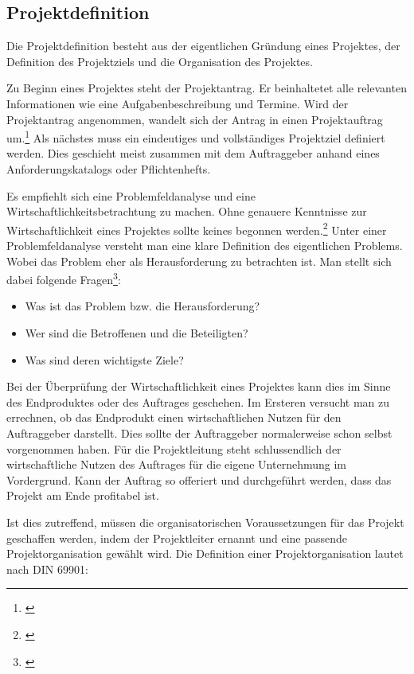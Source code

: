 \subsection{Projektdefinition}
Die Projektdefinition besteht aus der eigentlichen Gründung eines Projektes,
der Definition des Projektziels und die Organisation des Projektes.

Zu Beginn eines Projektes steht der Projektantrag. Er beinhaltetet alle relevanten
Informationen wie eine Aufgabenbeschreibung und Termine. Wird der Projektantrag
angenommen, wandelt sich der Antrag in einen Projektauftrag um.\footnote{\citealp*[Vgl.][S. 13]{burghardt2007einfuehrung}}
Als nächstes muss ein eindeutiges und vollständiges Projektziel definiert werden.
Dies geschieht meist zusammen mit dem Auftraggeber anhand eines Anforderungskatalogs
oder Pflichtenhefts.

Es empfiehlt sich eine Problemfeldanalyse und eine Wirtschaftlichkeitsbetrachtung
zu machen. Ohne genauere Kenntnisse zur Wirtschaftlichkeit eines Projektes sollte
keines begonnen werden.\footnote{\citealp*[Vgl.][S. 45]{burghardt2007einfuehrung}}
Unter einer Problemfeldanalyse versteht man eine klare Definition des eigentlichen
Problems. Wobei das Problem eher als Herausforderung zu betrachten ist. Man
stellt sich dabei folgende Fragen\footnote{\citealp*[Vgl.][S. 4]{prueter2007multi}}:

\begin{itemize}
    \item Was ist das Problem bzw. die Herausforderung?
    \item Wer sind die Betroffenen und die Beteiligten?
    \item Was sind deren wichtigste Ziele?
\end{itemize}

Bei der Überprüfung der Wirtschaftlichkeit eines Projektes kann dies im Sinne
des Endproduktes oder des Auftrages geschehen. Im Ersteren versucht man zu
errechnen, ob das Endprodukt einen wirtschaftlichen Nutzen für den Auftraggeber
darstellt. Dies sollte der Auftraggeber normalerweise schon selbst vorgenommen
haben. Für die Projektleitung steht schlussendlich der wirtschaftliche Nutzen
des Auftrages für die eigene Unternehmung im Vordergrund. Kann der Auftrag so
offeriert und durchgeführt werden, dass das Projekt am Ende profitabel ist.

Ist dies zutreffend, müssen die organisatorischen Voraussetzungen für das Projekt geschaffen werden,
indem der Projektleiter ernannt und eine passende Projektorganisation gewählt wird.
Die Definition einer Projektorganisation lautet nach DIN 69901:

